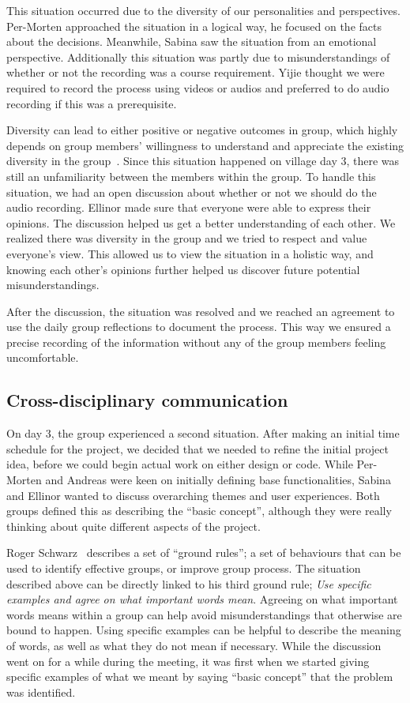 This situation occurred due to the diversity of our personalities and perspectives. Per-Morten approached the situation in a logical way, he focused on the facts about the decisions. Meanwhile, Sabina saw the situation from an emotional perspective. 
Additionally this situation was partly due to misunderstandings of whether or not the recording was a course requirement. Yijie thought we were required to record the process using videos or audios and preferred to do audio recording if this was a prerequisite.  

Diversity can lead to either positive or negative outcomes in group, which highly depends on group members' willingness to understand and appreciate the existing diversity in the group~\cite{2013johnson}. Since this situation happened on village day 3, there was still an unfamiliarity between the members within the group. To handle this situation, we had an open discussion about whether or not we should do the audio recording. Ellinor made sure that everyone were able to express their opinions.
The discussion helped us get a better understanding of each other. We realized there was diversity in the group and we tried to respect and value everyone’s view. This allowed us to view the situation in a holistic way, and knowing each other’s opinions further helped us discover future potential misunderstandings.

After the discussion, the situation was resolved and we reached an agreement to use the daily group reflections to document the process. This way we ensured a precise recording of the information without any of the group members feeling uncomfortable. 

\subsection{Cross-disciplinary communication}
On day 3, the group experienced a second situation. After making an initial time schedule for the project, we decided that we needed to refine the initial project idea, before we could begin actual work on either design or code. While Per-Morten and Andreas were keen on initially defining base functionalities, Sabina and Ellinor wanted to discuss overarching themes and user experiences. Both groups defined this as describing the “basic concept”, although they were really thinking about quite different aspects of the project. 

Roger Schwarz~\cite{scharz} describes a set of “ground rules”; a set of behaviours that can be used to identify effective groups, or improve group process. The situation described above can be directly linked to his third ground rule; \textit{Use specific examples and agree on what important words mean}. Agreeing on what important words means within a group can help avoid misunderstandings that otherwise are bound to happen. Using specific examples can be helpful to describe the meaning of words, as well as what they do not mean if necessary. While the discussion went on for a while during the meeting, it was first when we started giving specific examples of what we meant by saying “basic concept” that the problem was identified. 

